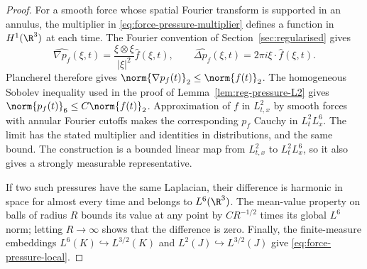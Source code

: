 \documentclass[11pt,reqno]{amsart}
\begin{document}
\begin{proof}
For a smooth force whose spatial Fourier transform is supported in an
annulus, the multiplier in \eqref{eq:force-pressure-multiplier} defines a
function in $H^1(\R^3)$ at each time. The Fourier convention of
Section~\ref{sec:regularised} gives
\[
 \widehat{\nabla p_f}(\xi,t)
   =\frac{\xi\otimes\xi}{|\xi|^2}\widehat f(\xi,t),
 \qquad
 \widehat{\Delta p_f}(\xi,t)=2\pi i\xi\cdot\widehat f(\xi,t).
\]
Plancherel therefore gives $\norm{\nabla p_f(t)}_2\le\norm{f(t)}_2$.
The homogeneous Sobolev inequality used in the proof of
Lemma~\ref{lem:reg-pressure-L2} gives
$\norm{p_f(t)}_6\le C\norm{f(t)}_2$. Approximation of $f$ in
$L^2_{t,x}$ by smooth forces with annular Fourier cutoffs makes the
corresponding $p_f$ Cauchy in $L^2_tL^6_x$. The limit has the stated
multiplier and identities in distributions, and the same bound. The
construction is a bounded linear map from $L^2_{t,x}$ to $L^2_tL^6_x$,
so it also gives a strongly measurable representative.

If two such pressures have the same Laplacian, their difference is harmonic
in space for almost every time and belongs to $L^6(\R^3)$. The mean-value
property on balls of radius $R$ bounds its value at any point by
$C R^{-1/2}$ times its global $L^6$ norm; letting $R\to\infty$ shows that
the difference is zero. Finally, the finite-measure embeddings
$L^6(K)\hookrightarrow L^{3/2}(K)$ and
$L^2(J)\hookrightarrow L^{3/2}(J)$ give
\eqref{eq:force-pressure-local}.
\end{proof}
\end{document}
